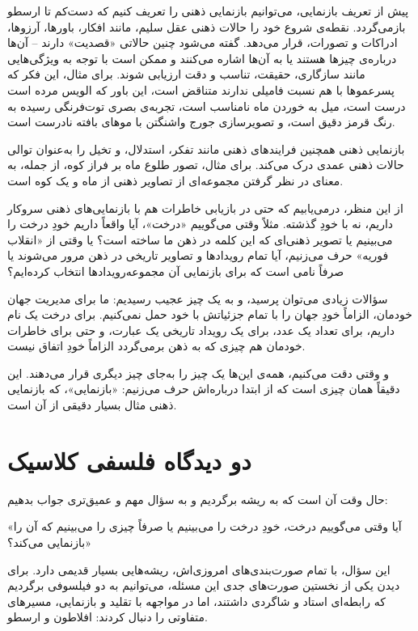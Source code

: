 پیش از تعریف بازنمایی، می‌توانیم بازنمایی ذهنی را تعریف کنیم که دست‌کم تا ارسطو بازمی‌گردد. نقطه‌ی شروع خود را حالات ذهنی عقل سلیم، مانند افکار، باورها، آرزوها، ادراکات و تصورات، قرار می‌دهد. گفته می‌شود چنین حالاتی «قصدیت» دارند -- آن‌ها درباره‌ی چیزها هستند یا به آن‌ها اشاره می‌کنند و ممکن است با توجه به ویژگی‌هایی مانند سازگاری، حقیقت، تناسب و دقت ارزیابی شوند. برای مثال، این فکر که پسرعموها با هم نسبت فامیلی ندارند متناقض است، این باور که الویس مرده است درست است، میل به خوردن ماه نامناسب است، تجربه‌ی بصری توت‌فرنگی رسیده به رنگ قرمز دقیق است، و تصویرسازی جورج واشنگتن با موهای بافته نادرست است\autocite{sep-mental-representation}.

بازنمایی ذهنی همچنین فرایندهای ذهنی مانند تفکر، استدلال، و تخیل را به‌عنوان توالی حالات ذهنی عمدی درک می‌کند. برای مثال، تصور طلوع ماه بر فراز کوه، از جمله، به معنای در نظر گرفتن مجموعه‌ای از تصاویر ذهنی از ماه و یک کوه است\autocite{sep-mental-representation}.

از این منظر، درمی‌یابیم که حتی در بازیابی خاطرات هم با بازنمایی‌های ذهنی سروکار داریم، نه با خودِ گذشته. مثلاً وقتی می‌گوییم «درخت»، آیا واقعاً داریم خودِ درخت را می‌بینیم یا تصویر ذهنی‌ای که این کلمه در ذهن ما ساخته است؟ یا وقتی از «انقلاب فوریه» حرف می‌زنیم، آیا تمام رویدادها و تصاویر تاریخی در ذهن مرور می‌شوند یا صرفاً نامی است که برای بازنمایی آن مجموعه‌رویدادها انتخاب کرده‌ایم؟

سؤالات زیادی می‌توان پرسید، و به یک چیز عجیب رسیدیم: ما برای مدیریت جهان خودمان، الزاماً خودِ جهان را با تمام جزئیاتش با خود حمل نمی‌کنیم. برای درخت یک نام داریم، برای تعداد یک عدد، برای یک رویداد تاریخی یک عبارت، و حتی برای خاطرات خودمان هم چیزی که به ذهن برمی‌گردد الزاماً خودِ اتفاق نیست.

و وقتی دقت می‌کنیم، همه‌ی این‌ها یک چیز را به‌جای چیز دیگری قرار می‌دهند. این دقیقاً همان چیزی است که از ابتدا درباره‌اش حرف می‌زنیم: «بازنمایی»، که بازنمایی ذهنی مثال بسیار دقیقی از آن است.

\newpage

\section{دو دیدگاه فلسفی کلاسیک}
\label{sec:two-classical-views}
حال وقت آن است که به ریشه برگردیم و به سؤال مهم و عمیق‌تری جواب بدهیم:

«آیا وقتی می‌گوییم درخت، خودِ درخت را می‌بینیم یا صرفاً چیزی را می‌بینیم که آن را بازنمایی می‌کند؟»

این سؤال، با تمام صورت‌بندی‌های امروزی‌اش، ریشه‌هایی بسیار قدیمی دارد. برای دیدن یکی از نخستین صورت‌های جدی این مسئله، می‌توانیم به دو فیلسوفی برگردیم که رابطه‌ای استاد و شاگردی داشتند، اما در مواجهه با تقلید و بازنمایی، مسیرهای متفاوتی را دنبال کردند: افلاطون و ارسطو.

